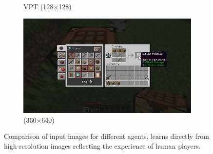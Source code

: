 \begin{figure}[h!]
\begin{subfigure}[b]{0.25\textwidth}
\caption{VPT (128$\times$128)}
\end{subfigure}\hfill%
\begin{subfigure}[b]{0.445\textwidth}
\includegraphics[width=\textwidth]{figures/inputs/image640}
\caption{\method (360$\times$640)}
\end{subfigure}%
\caption{%
Comparison of input images for different agents.
\method learns directly from high-resolution images reflecting the experience of human players.
}
\label{fig:inputs}
\end{figure}
